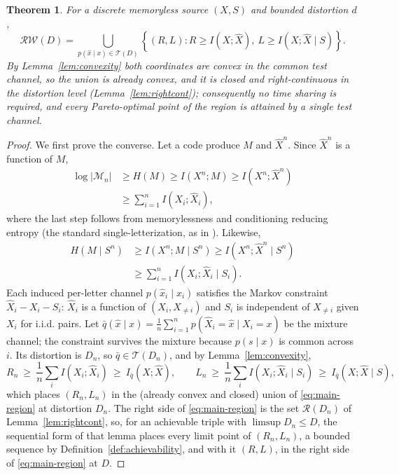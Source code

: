 \documentclass[11pt,onecolumn]{IEEEtran}
\newtheorem{theorem}{Theorem}
\newcommand{\hX}{\widehat{X}}
\newcommand{\hXn}{\widehat{X}^{n}}
\newcommand{\RW}{\mathcal{R}\!\mathcal{W}}
\begin{document}
\begin{theorem}\label{thm:main-region}
For a discrete memoryless source $(X,S)$ and bounded distortion $d$,
\begin{equation}
\boxed{
 \RW(D)
 =\bigcup_{p(\hat x\mid x)\in\mathcal T(D)}
 \left\{(R,L):
 R\ge I(X;\hX),\
 L\ge I(X;\hX\mid S)
 \right\}.}
 \label{eq:main-region}
\end{equation}
By Lemma~\ref{lem:convexity} both coordinates are convex in the common
test channel, so the union is already convex, and it is closed and
right-continuous in the distortion level (Lemma~\ref{lem:rightcont});
consequently no time sharing is required, and every Pareto-optimal
point of the region is attained by a single test channel.
\end{theorem}

\begin{proof}
We first prove the converse. Let a code produce $M$ and $\hXn$. Since $\hXn$
is a function of $M$,
\begin{align}
 \log|\mathcal M_n|
 &\ge H(M)\ge I(X^n;M)\ge I(X^n;\hXn)\nonumber\\
 &\ge \sum_{i=1}^{n}I(X_i;\hX_i),
 \label{eq:rate-conv}
\end{align}
where the last step follows from memorylessness and conditioning reducing
entropy (the standard single-letterization, as in \cite{wynerziv1976}). Likewise,
\begin{align}
 H(M\mid S^n)
 &\ge I(X^n;M\mid S^n)
 \ge I(X^n;\hXn\mid S^n)\nonumber\\
 &\ge \sum_{i=1}^{n}I(X_i;\hX_i\mid S_i).
 \label{eq:work-conv}
\end{align}
Each induced per-letter channel $p(\hat x_i\mid x_i)$ satisfies the Markov
constraint $\hX_i-X_i-S_i$: $\hX_i$ is a function of $(X_i,X_{\ne i})$ and
$S_i$ is independent of $X_{\ne i}$ given $X_i$ for i.i.d. pairs. Let
$\bar q(\hat x\mid x)=\frac1n\sum_{i=1}^{n}p(\hX_i=\hat x\mid X_i=x)$ be
the mixture channel; the constraint survives the mixture because
$p(s\mid x)$ is common across $i$. Its distortion is $D_n$, so
$\bar q\in\mathcal T(D_n)$, and by Lemma~\ref{lem:convexity},
\begin{equation*}
 R_n\ \ge\ \frac1n\sum_i I(X_i;\hX_i)\ \ge\ I_{\bar q}(X;\hX),
 \qquad
 L_n\ \ge\ \frac1n\sum_i I(X_i;\hX_i\mid S_i)\ \ge\ I_{\bar q}(X;\hX\mid S),
\end{equation*}
which places $(R_n,L_n)$ in the (already convex and closed) union of
\eqref{eq:main-region} at distortion $D_n$. The right side of
\eqref{eq:main-region} is the set $\mathcal R(D_n)$ of
Lemma~\ref{lem:rightcont}, so, for an achievable triple with
$\limsup D_n\le D$, the sequential form of that lemma places every
limit point of $(R_n,L_n)$, a bounded sequence by
Definition~\ref{def:achievability}, and with it $(R,L)$, in the right side of
\eqref{eq:main-region} at $D$.


\end{proof}
\end{document}
